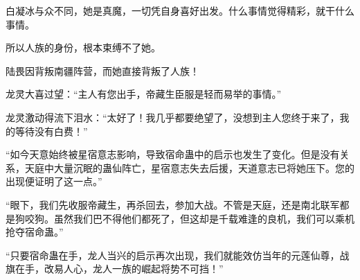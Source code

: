 \begin{this_body}
白凝冰与众不同，她是真魔，一切凭自身喜好出发。什么事情觉得精彩，就干什么事情。

所以人族的身份，根本束缚不了她。

陆畏因背叛南疆阵营，而她直接背叛了人族！

龙灵大喜过望：“主人有您出手，帝藏生臣服是轻而易举的事情。”

龙灵激动得流下泪水：“太好了！我几乎都要绝望了，没想到主人您终于来了，我的等待没有白费！”

“如今天意始终被星宿意志影响，导致宿命蛊中的启示也发生了变化。但是没有关系，天庭中大量沉眠的蛊仙阵亡，星宿意志失去后援，天道意志已将她压下。您的出现便证明了这一点。”

“眼下，我们先收服帝藏生，再杀回去，参加大战。不管是天庭，还是南北联军都是狗咬狗。虽然我们巴不得他们都死了，但这却是千载难逢的良机，我们可以乘机抢夺宿命蛊。”

“只要宿命蛊在手，龙人当兴的启示再次出现，我们就能效仿当年的元莲仙尊，战旗在手，改易人心，龙人一族的崛起将势不可挡！”

\end{this_body}

